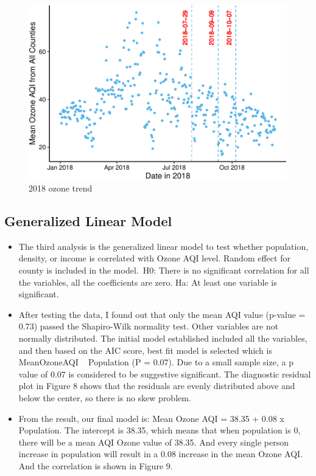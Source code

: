 \documentclass[12pt,]{article}
\begin{document}
\pagebreak

\begin{figure}
\centering
\includegraphics{Xia_ENV_872_Project_files/figure-latex/Final visualization 3-1.pdf}
\caption{2018 ozone trend}
\end{figure}

\pagebreak

\subsection{Generalized Linear Model}\label{generalized-linear-model}

\begin{itemize}
\item[]The third analysis is the generalized linear model to test whether population, density, or income is correlated with Ozone AQI level. Random effect for county is included in the model.\
H0: There is no significant correlation for all the variables, all the coefficients are zero. 
Ha: At least one variable is significant.\
\item[]After testing the data, I found out that only the mean AQI value (p-value = 0.73) passed the Shapiro-Wilk normality test. Other variables are not normally distributed. The initial model established included all the variables, and then based on the AIC score, best fit model is selected which is MeanOzoneAQI  ~ Population (P = 0.07). Due to a small sample size, a p value of 0.07 is considered to be suggestive significant. The diagnostic residual plot in Figure 8 shows that the residuals are evenly distributed above and below the center, so there is no skew problem.
\item[]From the result, our final model is: Mean Ozone AQI = 38.35 + 0.08 x Population. The intercept is 38.35, which means that when population is 0, there will be a mean AQI Ozone value of 38.35. And every single person increase in population will result in a 0.08 increase in the mean Ozone AQI. And the correlation is shown in Figure 9.
\end{itemize}
\end{document}
